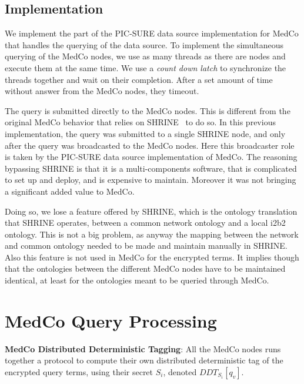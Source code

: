 
\subsection*{Implementation}

We implement the part of the PIC-SURE data source implementation for MedCo that handles the querying of the data source.
To implement the simultaneous querying of the MedCo nodes, we use as many threads as there are nodes and execute them at the same time. 
We use a \emph{count down latch} to synchronize the threads together and wait on their completion.
After a set amount of time without answer from the MedCo nodes, they timeout.

The query is submitted directly to the MedCo nodes. 
This is different from the original MedCo behavior that relies on SHRINE~\cite{todo} to do so.
In this previous implementation, the query was submitted to a single SHRINE node, and only after the query was broadcasted to the MedCo nodes.
Here this broadcaster role is taken by the PIC-SURE data source implementation of MedCo.
The reasoning bypassing SHRINE is that it is a multi-components software, that is complicated to set up and deploy, and is expensive to maintain.
Moreover it was not bringing a significant added value to MedCo.

Doing so, we lose a feature offered by SHRINE, which is the ontology translation that SHRINE operates, between a common network ontology and a local i2b2 ontology.
This is not a big problem, as anyway the mapping between the network and common ontology needed to be made and maintain manually in SHRINE.
Also this feature is not used in MedCo for the encrypted terms.
It implies though that the ontologies between the different MedCo nodes have to be maintained identical, at least for the ontologies meant to be queried through MedCo.

\section{MedCo Query Processing}
\label{sec:medco-process}


\item \textbf{MedCo Distributed Deterministic Tagging}:
All the MedCo nodes runs together a protocol to compute their own distributed deterministic tag of the encrypted query terms, using their secret $S_i$, denoted $DDT_{S_i}[q_v]$.

